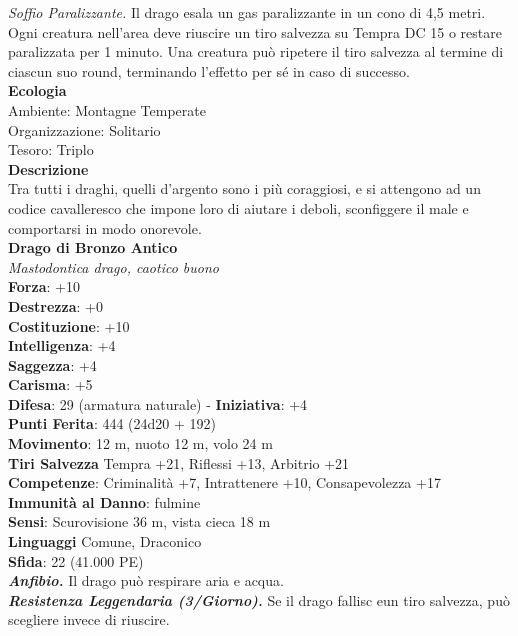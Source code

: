 \begin{multicols}{2}
\emph{Soffio Paralizzante.} Il drago esala un gas paralizzante in un cono di 4,5 metri. Ogni creatura nell'area deve riuscire un tiro salvezza su Tempra DC  15 o restare paralizzata per 1 minuto. Una creatura può ripetere il tiro salvezza al termine di ciascun suo round, terminando l'effetto per sé in caso di successo.\\
\textbf{Ecologia}\\
Ambiente: Montagne Temperate\\
Organizzazione: Solitario\\
Tesoro: Triplo\\
\textbf{Descrizione}\\
Tra tutti i draghi, quelli d’argento sono i più coraggiosi, e si attengono ad un codice cavalleresco che impone loro di aiutare i deboli, sconfiggere il male e comportarsi in modo onorevole.\\
\medskip\textbf{Drago di Bronzo Antico}\\
\emph{Mastodontica drago, caotico buono}\\
\textbf{Forza}: +10\\
\textbf{Destrezza}: +0\\
\textbf{Costituzione}: +10\\
\textbf{Intelligenza}: +4\\
\textbf{Saggezza}: +4\\
\textbf{Carisma}: +5\\
\textbf{Difesa}: 29 (armatura naturale) - \textbf{Iniziativa}: +4\\
\textbf{Punti Ferita}: 444 (24d20 + 192)\\
\textbf{Movimento}: 12 m, nuoto 12 m, volo 24 m\\
\textbf{Tiri Salvezza} Tempra +21, Riflessi +13, Arbitrio +21\\
\textbf{Competenze}: Criminalità +7, Intrattenere +10, Consapevolezza +17\\
\textbf{Immunità al Danno}: fulmine\\
\textbf{Sensi}: Scurovisione 36 m, vista cieca 18 m\\
\textbf{Linguaggi} Comune, Draconico\\
\textbf{Sfida}: 22 (41.000 PE)\smallskip\\
\emph{\textbf{Anfibio.}} Il drago può respirare aria e acqua.\\
\emph{\textbf{Resistenza Leggendaria (3/Giorno).}} Se il drago fallisc eun tiro salvezza, può scegliere invece di riuscire. \\

\end{multicols}
